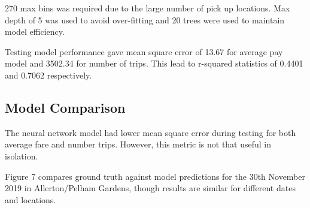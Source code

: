 \documentclass[11pt]{article}
\begin{document}
270 max bins was required due to the large number of pick up locations. Max depth of 5 was used to avoid over-fitting and 20 trees were used to maintain model efficiency. 

Testing model performance gave mean square error of 13.67 for average pay model and 3502.34 for number of trips. This lead to r-squared statistics of 0.4401 and 0.7062 respectively.

\subsection{Model Comparison}

The neural network model had lower mean square error during testing for both average fare and number trips. However, this metric is not that useful in isolation. 

Figure 7 compares ground truth against model predictions for the 30th November 2019 in Allerton/Pelham Gardens, though results are similar for different dates and locations.
\end{document}
